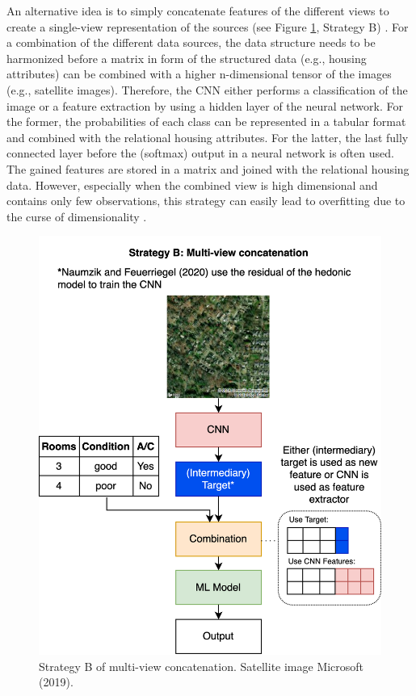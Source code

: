 \documentclass[letterpaper]{article} %
\begin{document}
An alternative idea is to simply concatenate features of the different views to create a single-view representation of the sources (see Figure \ref{strategyB}, Strategy B) \cite{zhao2017multi}. For a combination of the different data sources, the data structure needs to be harmonized before a matrix in form of the structured data (e.g., housing attributes) can be combined with a higher n-dimensional tensor of the images (e.g., satellite images). Therefore, the CNN either performs a classification of the image or a feature extraction by using a hidden layer of the neural network. For the former, the probabilities of each class can be represented in a tabular format and combined with the relational housing attributes. For the latter, the last fully connected layer before the (softmax) output in a neural network is often used. The gained features are stored in a matrix and joined with the relational housing data. However, especially when the combined view is high dimensional and contains only few observations, this strategy can easily lead to overfitting due to the curse of dimensionality \cite{xu2013survey}.

\begin{figure}[t]
\centering
\includegraphics[width=0.9\columnwidth]{StrategyB.png} %
\caption{Strategy B of multi-view concatenation. Satellite image \textcopyright \space Microsoft (2019).}
\label{strategyB}
\end{figure}
\end{document}
